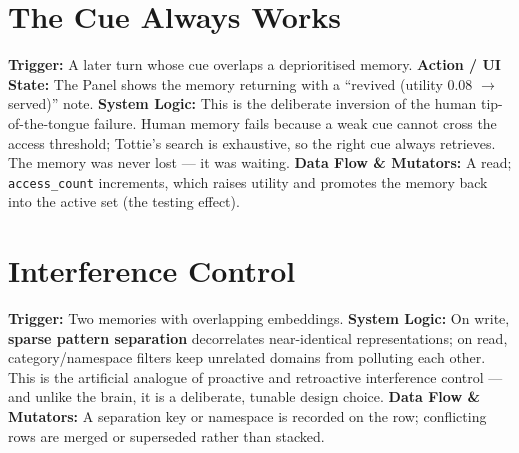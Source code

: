\section{The Cue Always Works}
\textbf{Trigger:} A later turn whose cue overlaps a deprioritised memory.
\textbf{Action / UI State:} The Panel shows the memory returning with a ``revived (utility 0.08
$\rightarrow$ served)'' note.
\textbf{System Logic:} This is the deliberate inversion of the human tip-of-the-tongue failure. Human
memory fails because a weak cue cannot cross the access threshold; Tottie's search is exhaustive, so
the right cue always retrieves. The memory was never lost --- it was waiting.
\textbf{Data Flow \& Mutators:} A read; \texttt{access\_count} increments, which raises utility and
promotes the memory back into the active set (the testing effect).

\section{Interference Control}
\textbf{Trigger:} Two memories with overlapping embeddings.
\textbf{System Logic:} On write, \textbf{sparse pattern separation} decorrelates near-identical
representations; on read, category/namespace filters keep unrelated domains from polluting each other.
This is the artificial analogue of proactive and retroactive interference control --- and unlike the
brain, it is a deliberate, tunable design choice.
\textbf{Data Flow \& Mutators:} A separation key or namespace is recorded on the row; conflicting
rows are merged or superseded rather than stacked.

